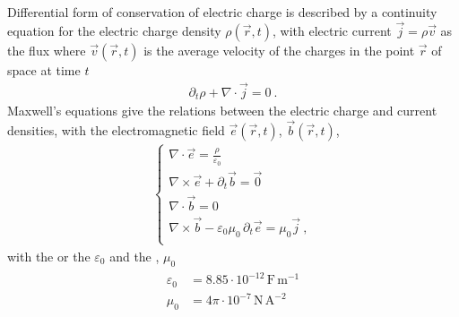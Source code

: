 \documentclass[letterpaper,10pt,english]{jupyterBook}
\begin{document}
\sphinxAtStartPar
{} Differential form of conservation of electric charge is described by a continuity equation for the electric charge density \(\rho(\vec{r},t)\), with electric current \(\vec{j} = \rho \vec{v}\) as the flux \sphinxhyphen{} where \(\vec{v}(\vec{r},t)\) is the average velocity of the charges in the point \(\vec{r}\) of space at time \(t\)
\begin{equation*}
\begin{split}\partial_t \rho + \nabla \cdot \vec{j} = 0 \ .\end{split}
\end{equation*}
\sphinxAtStartPar
{} Maxwell’s equations give the relations between the electric charge and current densities, with the electromagnetic field \(\vec{e}(\vec{r}, t)\), \(\vec{b}(\vec{r},t)\),
\begin{equation*}
\begin{split}\begin{cases}
 \nabla \cdot \vec{e} = \frac{\rho}{\varepsilon_0} \\
 \nabla \times \vec{e} + \partial_t \vec{b} = \vec{0} \\ 
 \nabla \cdot \vec{b} = 0 \\
 \nabla \times \vec{b} - \varepsilon_0 \mu_0 \, \partial_t \vec{e} = \mu_0 \vec{j}  \ ,\\
\end{cases}\end{split}
\end{equation*}
\sphinxAtStartPar
with the  \sphinxhyphen{} or the  \sphinxhyphen{} \(\varepsilon_0\) and the , \(\mu_0\)
\begin{equation*}
\begin{split}\begin{aligned}
  \varepsilon_0 & = 8.85 \cdot 10^{-12} \, \text{F}\, \text{m}^{-1} \\
          \mu_0 & = 4 \pi \cdot 10^{-7} \, \text{N}\, \text{A}^{-2} \\
\end{aligned}\end{split}
\end{equation*}
\end{document}
